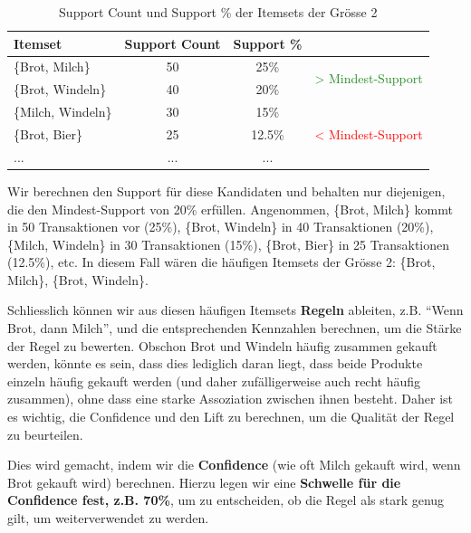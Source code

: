 \begin{myexample}
    \begin{table}[H]
        \centering
        \begin{tabular}{lccl}
            Itemset            & Support Count & Support \% &                                                             \\
            \midrule
            \{Brot, Milch\}    & 50            & 25\%       & \multirow{2}{*}{\textcolor{ForestGreen}{> Mindest-Support}} \\
            \{Brot, Windeln\}  & 40            & 20\%       &                                                             \\\midrule
            \{Milch, Windeln\} & 30            & 15\%       & \multirow{3}{*}{\textcolor{red}{< Mindest-Support}}         \\
            \{Brot, Bier\}     & 25            & 12.5\%     &                                                             \\
            ...                & ...           & ...        &                                                             \\
        \end{tabular}
        \caption{Support Count und Support \% der Itemsets der Grösse 2}
    \end{table}

    Wir berechnen den Support für diese Kandidaten und behalten nur diejenigen, die den Mindest-Support von 20\% erfüllen. Angenommen, \{Brot, Milch\} kommt in 50 Transaktionen vor (25\%), \{Brot, Windeln\} in 40 Transaktionen (20\%), \{Milch, Windeln\} in 30 Transaktionen (15\%), \{Brot, Bier\} in 25 Transaktionen (12.5\%), etc. In diesem Fall wären die häufigen Itemsets der Grösse 2: \{Brot, Milch\}, \{Brot, Windeln\}.

    Schliesslich können wir aus diesen häufigen Itemsets \textbf{Regeln} ableiten, z.B. \enquote{Wenn Brot, dann Milch}, und die entsprechenden Kennzahlen berechnen, um die Stärke der Regel zu bewerten. Obschon Brot und Windeln häufig zusammen gekauft werden, könnte es sein, dass dies lediglich daran liegt, dass beide Produkte einzeln häufig gekauft werden (und daher zufälligerweise auch recht häufig zusammen), ohne dass eine starke Assoziation zwischen ihnen besteht. Daher ist es wichtig, die Confidence und den Lift zu berechnen, um die Qualität der Regel zu beurteilen.

    Dies wird gemacht, indem wir die \textbf{Confidence} (wie oft Milch gekauft wird, wenn Brot gekauft wird) berechnen. Hierzu legen wir eine \textbf{Schwelle für die Confidence fest, z.B. 70\%}, um zu entscheiden, ob die Regel als stark genug gilt, um weiterverwendet zu werden.


\end{myexample}
